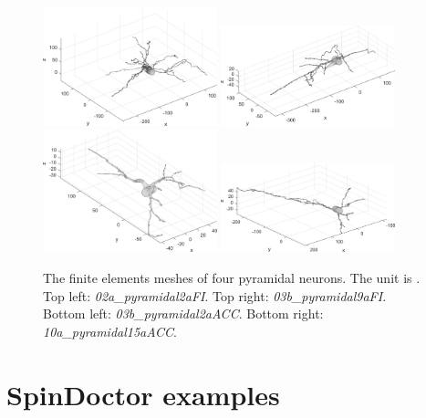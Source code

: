 \documentclass[a4paper]{article}
\begin{document}
\begin{figure}
    \centering
    \includegraphics[width=0.45\textwidth]{paper_neuron/02a_pyramidal2aFI.jpg}
    \includegraphics[width=0.45\textwidth]{paper_neuron/03b_pyramidal9aFI.jpg} \\
    \includegraphics[width=0.45\textwidth]{paper_neuron/03b_pyramidal2aACC.jpg}
    \includegraphics[width=0.45\textwidth]{paper_neuron/10a_pyramidal15aACC.jpg}
    \caption{The finite elements meshes of four pyramidal neurons. The unit is \lunit. Top left: {\it 02a\_pyramidal2aFI}. Top right: {\it 03b\_pyramidal9aFI}. Bottom left: {\it 03b\_pyramidal2aACC}. Bottom right: {\it 10a\_pyramidal15aACC}.}
    \label{fig:pyramidal_neurons}
\end{figure}





\clearpage

\section{SpinDoctor examples}
\end{document}
